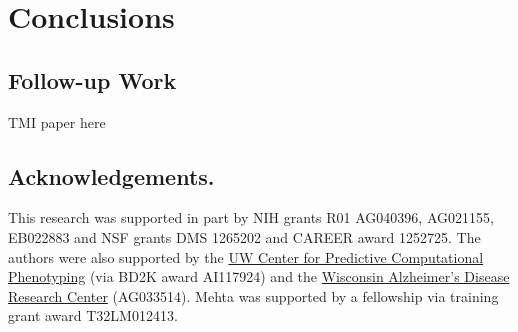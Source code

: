 \section{Conclusions}

\subsection{Follow-up Work}
TMI paper here

\subsection{Acknowledgements.}
This research was supported in part by NIH grants R01 AG040396, AG021155, EB022883 
and NSF grants DMS 1265202 and CAREER award 1252725. The authors were also supported by 
the \href{http://cpcp.wisc.edu/}{UW Center for Predictive Computational Phenotyping} (via BD2K award AI117924) and the 
\href{http://www.adrc.wisc.edu/}{Wisconsin Alzheimer's Disease Research Center} (AG033514). 
Mehta was supported by a fellowship via training grant award T32LM012413. 
